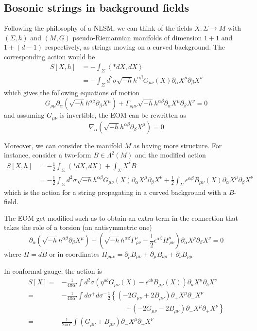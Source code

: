 \documentclass[a4paper,12pt]{article}
\numberwithin{equation}{section}
\numberwithin{thm}{section}
\numberwithin{exm}{section}
\newcommand{\p}{\partial}
\newcommand{\N}{{\nabla}}
\newcommand{\<}{{\langle}}
\renewcommand{\>}{{\rangle}}
\renewcommand{\a}{{\alpha}}
\renewcommand{\b}{{\beta}}
\newcommand{\e}{{\epsilon}}
\newcommand{\G}{{\Gamma}}
\renewcommand{\L}{{\Lambda}}
\newcommand{\m}{{\mu}}
\newcommand{\n}{{\nu}}
\renewcommand{\r}{{\rho}}
\newcommand{\s}{{\sigma}}
\renewcommand{\S}{{\Sigma}}
\begin{document}
\subsection{Bosonic strings in background fields}
Following the philosophy of a NLSM, we can think of the fields $X:\S\rightarrow M$ with $(\S,h)$ and $(M,G)$ pseudo-Riemannian manifolds of dimension $1+1$ and $1+(d-1)$ respectively, as strings moving on a curved background. The corresponding action would be
	\begin{align}
	S[X,h] & = - \int_\S \left< *dX,dX \right> \nonumber \\
	& = - \int_\S d^2\s \sqrt{-h} h^{\a\b} G_{\m\n}(X) \p_\a X^\m \p_\b X^\n
	\end{align}
which gives the following equations of motion
	\begin{equation}
	G_{\r\m}\p_\a(\sqrt{-h} h^{\a\b}\p_\b X^\m) + \G_{\r\m\n}\sqrt{-h} h^{\a\b} \p_\a X^\m \p_\b X^\n = 0
	\end{equation}
and assuming $G_{\m\n}$ is invertible, the EOM can be rewritten as
	\begin{equation}
	\N_\a(\sqrt{-h} h^{\a\b}\p_\b X^\m) = 0
	\end{equation}
	
Moreover, we can consider the manifold $M$ as having more structure. For instance, consider a two-form $B\in\L^2(M)$ and the modified action
	\begin{align}
	S[X,h] & = - \frac{1}{2}\int_\S \left< *dX,dX \right> + \int_\S X^* B \nonumber \\
	& = -\frac{1}{2}\int_\S d^2\s \sqrt{-h} h^{\a\b} G_{\m\n}(X) \p_\a X^\m \p_\b X^\n + \frac{1}{2}\int_\S \e^{\a\b} B_{\m\n}(X) \p_\a X^\m \p_\b X^\n
	\end{align}
which is the action for a string propagating in a curved background with a $B$-field.

The EOM get modified such as to obtain an extra term in the connection that takes the role of a torsion (an antisymmetric one)
	\begin{equation}
	\p_\a(\sqrt{-h} h^{\a\b}\p_\b X^\m) + \left(\sqrt{-h}h^{\a\b}\G^\m_{\ \r\n} - \frac{1}{2} \e^{\a\b}H^\m_{\ \r\n}\right) \p_\a X^\r \p_\b X^\n = 0
	\end{equation}
where $H = dB$ or in coordinates $H_{\r\m\n} = \p_\r B_{\m\n} + \p_\m B_{\n\r} + \p_\n B_{\r\m}$

In conformal gauge, the action is
	\begin{align}
	S[X]=&-\frac{1}{4\pi\a'} \int d^2\s \left(\eta^{ab} G_{\m\n}(X) - \e^{ab} B_{\m\n}(X)\right) \p_aX^\m \p_bX^\n \nonumber \\
	=&-\frac{1}{4\pi\a'} \int d\s^+d\s^- \frac{1}{2}\left\{(-2G_{\m\n} + 2B_{\m\n}) \p_+X^\m \p_-X^\n\right. \nonumber \\
	&\hspace{4cm}\left.+ (-2G_{\m\n} - 2B_{\m\n}) \p_-X^\m \p_+X^\n\right\} \nonumber \\
	=&\frac{1}{2\pi\a'} \int (G_{\m\n} + B_{\m\n}) \p_-X^\m \p_+X^\n
	\end{align}
\end{document}

